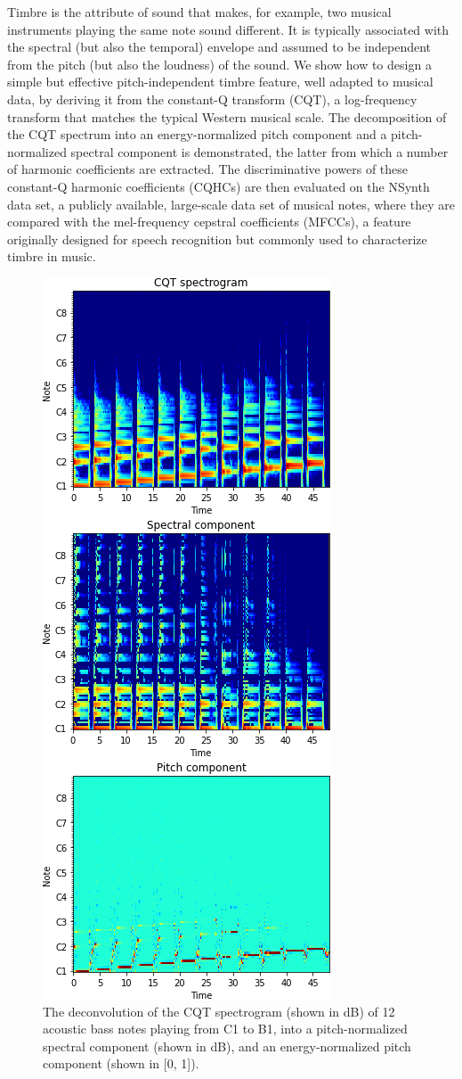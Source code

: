 \documentclass{article}
\begin{document}
Timbre is the attribute of sound that makes, for example, two musical instruments playing the same note sound different. It is typically associated with the spectral (but also the temporal) envelope and assumed to be independent from the pitch (but also the loudness) of the sound. We show how to design a simple but effective pitch-independent timbre feature, well adapted to musical data, by deriving it from the constant-Q transform (CQT), a log-frequency transform that matches the typical Western musical scale. The decomposition of the CQT spectrum into an energy-normalized pitch component and a pitch-normalized spectral component is demonstrated, the latter from which a number of harmonic coefficients are extracted. The discriminative powers of these constant-Q harmonic coefficients (CQHCs) are then evaluated on the NSynth data set, a publicly available, large-scale data set of musical notes, where they are compared with the mel-frequency cepstral coefficients (MFCCs), a feature originally designed for speech recognition but commonly used to characterize timbre in music.

\begin{figure}[!htb]
	\centering
	\includegraphics[width=0.6\columnwidth]{Images/cqtdeconv.png}
	\caption{The deconvolution of the CQT spectrogram (shown in dB) of 12 acoustic bass notes playing from C1 to B1, into a pitch-normalized spectral component (shown in dB), and an energy-normalized pitch component (shown in [0, 1]).}
	\label{fig:cqtdeconv}
\end{figure}
\end{document}
